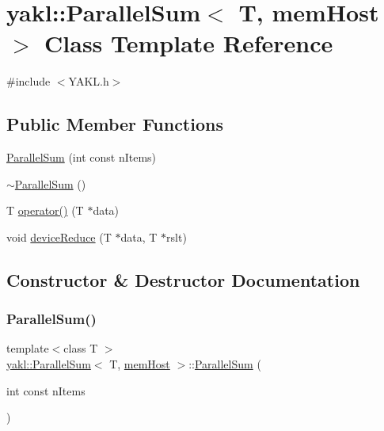 \hypertarget{classyakl_1_1ParallelSum_3_01T_00_01memHost_01_4}{}\section{yakl\+:\+:Parallel\+Sum$<$ T, mem\+Host $>$ Class Template Reference}
\label{classyakl_1_1ParallelSum_3_01T_00_01memHost_01_4}


{\ttfamily \#include $<$Y\+A\+K\+L.\+h$>$}

\subsection*{Public Member Functions}
\begin{DoxyCompactItemize}
\item 
\hyperlink{classyakl_1_1ParallelSum_3_01T_00_01memHost_01_4_a916bb6e5ea78fd22ad9d175c511a05ab}{Parallel\+Sum} (int const n\+Items)
\item 
\hyperlink{classyakl_1_1ParallelSum_3_01T_00_01memHost_01_4_a8a6b2140b25f36f8919c19c5d1682786}{$\sim$\+Parallel\+Sum} ()
\item 
T \hyperlink{classyakl_1_1ParallelSum_3_01T_00_01memHost_01_4_a292958b09ad6e72bba6e396e40a9e6e8}{operator()} (T $\ast$data)
\item 
void \hyperlink{classyakl_1_1ParallelSum_3_01T_00_01memHost_01_4_a5199a372d9078c00c913c70a40935dde}{device\+Reduce} (T $\ast$data, T $\ast$rslt)
\end{DoxyCompactItemize}


\subsection{Constructor \& Destructor Documentation}
\mbox{\label{classyakl_1_1ParallelSum_3_01T_00_01memHost_01_4_a916bb6e5ea78fd22ad9d175c511a05ab}} 
\subsubsection{\texorpdfstring{Parallel\+Sum()}{ParallelSum()}}
{\footnotesize\ttfamily template$<$class T $>$ \\
\hyperlink{classyakl_1_1ParallelSum}{yakl\+::\+Parallel\+Sum}$<$ T, \hyperlink{namespaceyakl_aae8a8c910fec7cef7db68c9658c16405}{mem\+Host} $>$\+::\hyperlink{classyakl_1_1ParallelSum}{Parallel\+Sum} (\begin{DoxyParamCaption}\item[{int const}]{n\+Items }\end{DoxyParamCaption})\hspace{0.3cm}{\ttfamily [inline]}}

